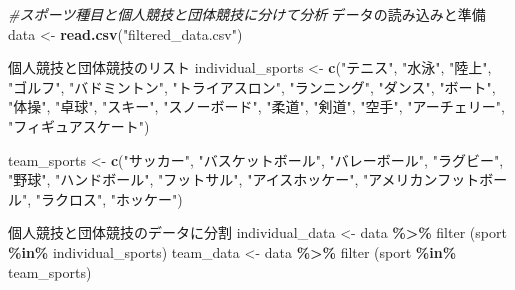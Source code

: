 \documentclass[12pt,a4paper,xelatex,ja=standard]{bxjsarticle}
\newenvironment{Shaded}{\begin{snugshade}}{\end{snugshade}}
\newcommand{\CommentTok}[1]{\textcolor[rgb]{0.56,0.35,0.01}{\textit{#1}}}
\newcommand{\FunctionTok}[1]{\textcolor[rgb]{0.13,0.29,0.53}{\textbf{#1}}}
\newcommand{\NormalTok}[1]{#1}
\newcommand{\OtherTok}[1]{\textcolor[rgb]{0.56,0.35,0.01}{#1}}
\newcommand{\SpecialCharTok}[1]{\textcolor[rgb]{0.81,0.36,0.00}{\textbf{#1}}}
\newcommand{\StringTok}[1]{\textcolor[rgb]{0.31,0.60,0.02}{#1}}
\begin{document}
\begin{Shaded}
\begin{Highlighting}[]
\CommentTok{\#スポーツ種目と個人競技と団体競技に分けて分析}
\NormalTok{データの読み込みと準備}
\NormalTok{data }\OtherTok{\textless{}{-}} \FunctionTok{read.csv}\NormalTok{(}\StringTok{"filtered\_data.csv"}\NormalTok{)}


\NormalTok{個人競技と団体競技のリスト}
\NormalTok{individual\_sports }\OtherTok{\textless{}{-}} \FunctionTok{c}\NormalTok{(}\StringTok{"テニス"}\NormalTok{, }\StringTok{"水泳"}\NormalTok{, }\StringTok{"陸上"}\NormalTok{, }\StringTok{"ゴルフ"}\NormalTok{,}
                       \StringTok{"バドミントン"}\NormalTok{, }\StringTok{"トライアスロン"}\NormalTok{, }\StringTok{"ランニング"}\NormalTok{, }
                       \StringTok{"ダンス"}\NormalTok{, }\StringTok{"ボート"}\NormalTok{, }\StringTok{"体操"}\NormalTok{, }\StringTok{"卓球"}\NormalTok{,}
                       \StringTok{"スキー"}\NormalTok{, }\StringTok{"スノーボード"}\NormalTok{, }\StringTok{"柔道"}\NormalTok{, }\StringTok{"剣道"}\NormalTok{, }
                       \StringTok{"空手"}\NormalTok{, }\StringTok{"アーチェリー"}\NormalTok{, }\StringTok{"フィギュアスケート"}\NormalTok{)}

\NormalTok{team\_sports }\OtherTok{\textless{}{-}} \FunctionTok{c}\NormalTok{(}\StringTok{"サッカー"}\NormalTok{, }\StringTok{"バスケットボール"}\NormalTok{, }\StringTok{"バレーボール"}\NormalTok{,}
                 \StringTok{"ラグビー"}\NormalTok{, }\StringTok{"野球"}\NormalTok{, }\StringTok{"ハンドボール"}\NormalTok{, }
                 \StringTok{"フットサル"}\NormalTok{, }\StringTok{"アイスホッケー"}\NormalTok{, }
                 \StringTok{"アメリカンフットボール"}\NormalTok{, }\StringTok{"ラクロス"}\NormalTok{, }\StringTok{"ホッケー"}\NormalTok{)}

\NormalTok{個人競技と団体競技のデータに分割}
\NormalTok{individual\_data }\OtherTok{\textless{}{-}}\NormalTok{ data }\SpecialCharTok{\%\textgreater{}\%}\NormalTok{ filter}
\NormalTok{(sport }\SpecialCharTok{\%in\%}\NormalTok{ individual\_sports)}
\NormalTok{team\_data }\OtherTok{\textless{}{-}}\NormalTok{ data }\SpecialCharTok{\%\textgreater{}\%}\NormalTok{ filter}
\NormalTok{(sport }\SpecialCharTok{\%in\%}\NormalTok{ team\_sports)}


\end{Highlighting}
\end{Shaded}
\end{document}
